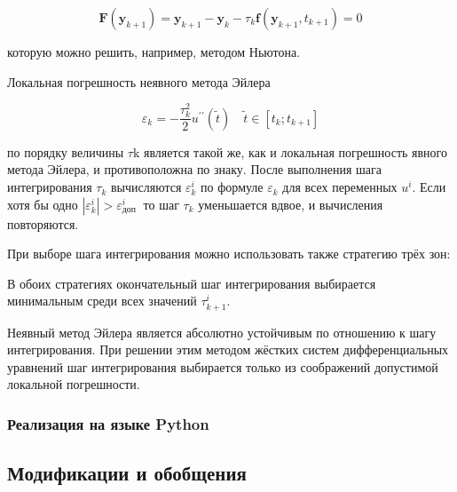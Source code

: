 \documentclass[a4paper]{article}
\begin{document}
{{{{{{{{$$
\mathbf{F}\left(\mathbf{y}_{k+1}\right)=\mathbf{y}_{k+1}-\mathbf{y}_{k}-\tau_{k} \mathbf{f}\left(\mathbf{y}_{k+1}, t_{k+1}\right)=0
$$

которую можно решить, например, методом Ньютона.

Локальная погрешность неявного метода Эйлера

$$
\varepsilon_{k}=-\frac{\tau_{k}^{2}}{2} u^{\prime \prime}(\tilde{t}) \quad \tilde{t} \in\left[t_{k} ; t_{k+1}\right]
$$


по порядку величины $\tau \mathrm{k}$ является такой же, как и локальная погрешность явного метода Эйлера, и противоположна по знаку. После выполнения шага интегрирования $\tau_{k}$ вычисляются $\varepsilon_{k}^{i}$ по формуле $\varepsilon_{k}$ для всех переменных $u^{i}$. Если хотя бы одно $\left|\varepsilon_{k}^{i}\right|>\varepsilon_{\text {доп }}^{i}$ то шаг $\tau_{k}$ уменьшается вдвое, и вычисления повторяются.

При выборе шага интегрирования можно использовать также стратегию трёх зон:


В обоих стратегиях окончательный шаг интегрирования выбирается минимальным среди всех значений $\tau_{k+1}^{i}$.

Неявный метод Эйлера является абсолютно устойчивым по отношению к шагу интегрирования. При решении этим методом жёстких систем дифференциальных уравнений шаг интегрирования выбирается только из соображений допустимой локальной погрешности.

\subsubsection{Реализация на языке Python}



\subsection{Модификации и обобщения}

}}}}}}}}
\end{document}
